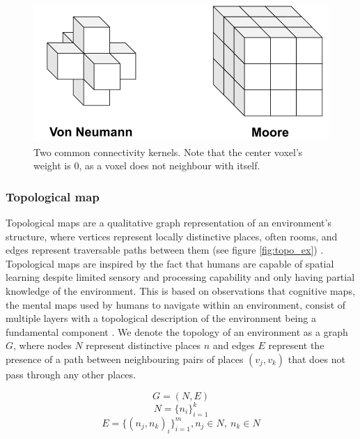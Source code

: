 \begin{figure}[h]
    \centering
    \includegraphics*[width=.7\textwidth]{./fig/voxel_neighbourhood.pdf}
    \caption{Two common connectivity kernels. Note that the center voxel's weight is 0, as a voxel does not neighbour with itself.}
    \label{fig:vg_nbs}
\end{figure}


\subsubsection{Topological map}
Topological maps are a qualitative graph representation of an environment's structure, where vertices represent locally distinctive places, often rooms, and edges represent traversable paths between them  (see figure \ref{fig:topo_ex}) \citep{thrun_learning_1998,kuipers_robust_1988}. Topological maps are inspired by the fact that humans are capable of spatial learning despite limited sensory and processing capability and only having partial knowledge of the environment. This is based on observations that cognitive maps, the mental maps used by humans to navigate within an environment, consist of multiple layers with a topological description of the environment being a fundamental component \citep{kuipers_robust_1988,kuipers_modeling_1978}. We denote the topology of an environment as a graph \(G\), where nodes \(N\) represent distinctive places \(n\) and edges \(E\) represent the presence of a path between neighbouring pairs of places \((v_j,v_k)\) that does not pass through any other places.

\begin{equation}
    \label{eq:G}
    G=(N, E)
\end{equation}
\begin{equation}
    \label{eq:V}
    N=\{n_i\}_{i=1}^k
\end{equation}
\begin{equation}
    \label{eq:E}
    E=\{(n_j,n_k)_i\}_{i=1}^m, n_j \in N,\ n_k \in N
\end{equation}

